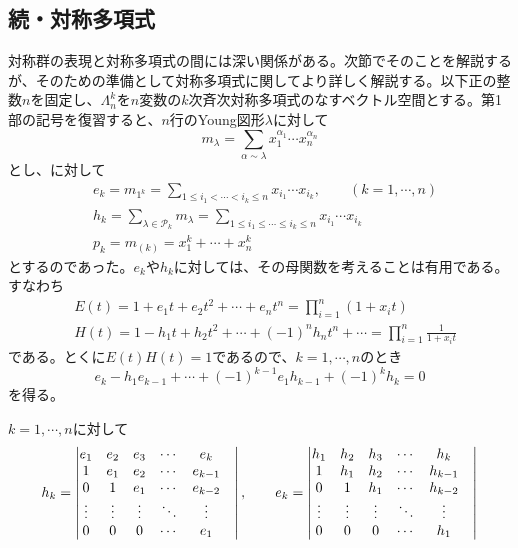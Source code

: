 \documentclass{ltjsreport}
\begin{document}
\subsection{続・対称多項式}
対称群の表現と対称多項式の間には深い関係がある。次節でそのことを解説するが、そのための準備として対称多項式に関してより詳しく解説する。以下正の整数$n$を固定し、$\Lambda^k_n$を$n$変数の$k$次斉次対称多項式のなすベクトル空間とする。第1部の記号を復習すると、$n$行のYoung図形$\lambda$に対して
\[
m_\lambda=\sum_{\alpha\sim\lambda}x_1^{\alpha_1}\cdots x_n^{\alpha_n}  
\]
とし、に対して
\begin{align*}
  &e_k=m_{1^k}=\sum_{1\leq i_1<\cdots<i_k\leq n}x_{i_1}\cdots x_{i_k},\qquad(k=1,\cdots,n)\\
  &h_k=\sum_{\lambda\in\mathcal{P}_k}m_\lambda=\sum_{1\leq i_1\leq\cdots\leq i_k\leq n}x_{i_1}\cdots x_{i_k}\\
  &p_k=m_{(k)}=x_1^k+\cdots+x_n^k
\end{align*}
とするのであった。$e_k$や$h_k$に対しては、その母関数を考えることは有用である。すなわち
\begin{align}
  &E(t)=1+e_1t+e_2t^2+\cdots+e_nt^n=\prod_{i=1}^n(1+x_it) \label{gen_func_of_e}\\
  &H(t)=1-h_1t+h_2t^2+\cdots+(-1)^nh_nt^n+\cdots=\prod_{i=1}^n\frac{1}{1+x_it}
\end{align}
である。とくに$E(t)H(t)=1$であるので、$k=1,\cdots,n$のとき
\begin{equation}\label{e_to_h}
  e_k-h_1e_{k-1}+\cdots+(-1)^{k-1}e_1h_{k-1}+(-1)^kh_k=0   
\end{equation}
を得る。

\begin{prop}\label{det_formula}
  $k=1,\cdots,n$に対して
  \begin{align*}
    h_k=\begin{vmatrix} 
      e_1&e_2&e_3&\cdots&e_k\\
      1&e_1&e_2&\cdots&e_{k-1}\\
      0&1&e_1&\cdots&e_{k-2}\\
      \vdots&\vdots&\vdots&\ddots&\vdots&\\
      0&0&0&\cdots&e_1 \end{vmatrix},\qquad
    e_k=\begin{vmatrix} 
      h_1&h_2&h_3&\cdots&h_k\\
      1&h_1&h_2&\cdots&h_{k-1}\\
      0&1&h_1&\cdots&h_{k-2}\\
      \vdots&\vdots&\vdots&\ddots&\vdots&\\
      0&0&0&\cdots&h_1
     \end{vmatrix}
  \end{align*}
\end{prop}
\end{document}
